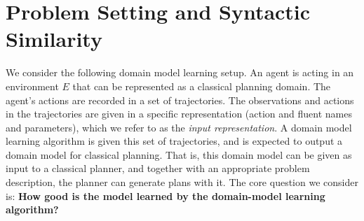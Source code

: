 \documentclass[letterpaper]{article} %
\newcommand{\realm}{{\ensuremath{M^*}}\xspace}
\newif\ifaddcomments
\newcommand{\roni}[1]{\ifaddcomments{\textcolor{red}{[Roni: #1]}}\fi}
\newcommand{\mauro}[1]{\ifaddcomments{\textcolor{green}{[Mauro: #1]}}\fi}
\newcommand{\gregor}[1]{\ifaddcomments{\textcolor{orange}{[Gregor: #1]}}\fi}
\begin{document}

\section{Problem Setting and Syntactic Similarity}
\label{sec:problem-setting}


We consider the following domain model learning setup. 
An agent is acting in an environment $E$ that can be represented as a classical planning domain. 
The agent's actions are recorded in a set of trajectories. %
The observations and actions in the trajectories are given in a specific representation (action and fluent names and parameters), which we refer to as the \emph{input representation}. 
A domain model learning algorithm is given this set of trajectories, and is expected to output a domain model for classical planning. 
That is, this domain model can be given as input to a classical planner, and together with an appropriate problem description, the planner can generate plans with it.
The core question we consider is: \textbf{How good is the model learned by the domain-model learning algorithm?}
\end{document}
